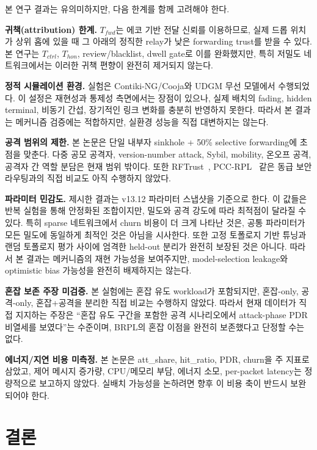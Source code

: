 \documentclass[10pt,a4paper,twocolumn]{article}
\begin{document}
본 연구 결과는 유의미하지만, 다음 한계를 함께 고려해야 한다.

\textbf{귀책(attribution) 한계.}
$T_{fwd}$는 에코 기반 전달 신뢰를 이용하므로,
실제 드롭 위치가 상위 홉에 있을 때 그 아래의 정직한 relay가
낮은 forwarding trust를 받을 수 있다.
본 연구는 $T_{ctrl}$, $T_{hon}$, review/blacklist, dwell gate로 이를 완화했지만,
특히 저밀도 네트워크에서는 이러한 귀책 편향이 완전히 제거되지 않는다.

\textbf{정적 시뮬레이션 환경.}
실험은 Contiki-NG/Cooja와 UDGM 무선 모델에서 수행되었다.
이 설정은 재현성과 통제성 측면에서는 장점이 있으나,
실제 배치의 fading, hidden terminal, 비동기 간섭, 장기적인 링크 변화를
충분히 반영하지 못한다.
따라서 본 결과는 메커니즘 검증에는 적합하지만,
실환경 성능을 직접 대변하지는 않는다.

\textbf{공격 범위의 제한.}
본 논문은 단일 내부자 sinkhole + 50\% selective forwarding에 초점을 맞춘다.
다중 공모 공격자, version-number attack, Sybil, mobility,
온오프 공격, 공격자 간 역할 분담은 현재 범위 밖이다.
또한 RFTrust~\cite{rftrust2021}, PCC-RPL~\cite{pccrpl2022} 같은
동급 보안 라우팅과의 직접 비교도 아직 수행하지 않았다.

\textbf{파라미터 민감도.}
제시한 결과는 v13.12 파라미터 스냅샷을 기준으로 한다.
이 값들은 반복 실험을 통해 안정화된 조합이지만,
밀도와 공격 강도에 따라 최적점이 달라질 수 있다.
특히 sparse 네트워크에서 churn 비용이 더 크게 나타난 것은,
공통 파라미터가 모든 밀도에 동일하게 최적인 것은 아님을 시사한다.
또한 고정 토폴로지 기반 튜닝과 랜덤 토폴로지 평가 사이에
엄격한 held-out 분리가 완전히 보장된 것은 아니다.
따라서 본 결과는 메커니즘의 재현 가능성을 보여주지만,
model-selection leakage와 optimistic bias 가능성을 완전히 배제하지는 않는다.

\textbf{혼잡 보존 주장 미검증.}
본 실험에는 혼잡 유도 workload가 포함되지만,
혼잡-only, 공격-only, 혼잡+공격을 분리한 직접 비교는 수행하지 않았다.
따라서 현재 데이터가 직접 지지하는 주장은
``혼잡 유도 구간을 포함한 공격 시나리오에서 attack-phase PDR 비열세를 보였다''는 수준이며,
BRPL의 혼잡 이점을 완전히 보존했다고 단정할 수는 없다.

\textbf{에너지/지연 비용 미측정.}
본 논문은 att\_share, hit\_ratio, PDR, churn을 주 지표로 삼았고,
제어 메시지 증가량, CPU/메모리 부담, 에너지 소모, per-packet latency는
정량적으로 보고하지 않았다.
실배치 가능성을 논하려면 향후 이 비용 축이 반드시 보완되어야 한다.


\section{결론}
\label{sec:conclusion}
\end{document}

